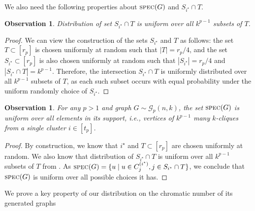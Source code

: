 \documentclass[11pt]{article}
\newtheorem{claim}[lemma]{Claim}
\newtheorem{observation}[lemma]{Observation}
\theoremstyle{definition}
\renewcommand{\geq}{\geqslant}
\newcommand{\card}[1]{\left\vert{#1}\right\vert}
\newcommand{\player}[1]{\ensuremath{\mathcal{P}_{#1}}}
\newcommand{\cG}{\ensuremath{\mathcal{G}}}
\newcommand{\cliqnum}[2]{\ensuremath{C^{(#1)}_{#2}}}
\newcommand{\spec}{\ensuremath{\textnormal{\textsc{spec}}}}
\newcommand{\istar}{\ensuremath{i^{\star}}}
\begin{document}
We also need the following properties about $\spec(G)$ and $S_{\istar} \cap T$. 
		\begin{observation}\label{obs:Sstar-T}
			Distribution of set $S_{\istar} \cap T$ is uniform over all $k^{p-1}$ subsets of $T$.
		\end{observation}
		\begin{proof}
			We can view the construction of the sets $S_{\istar}$ and $T$ as follows: the set $T\subset [r_p]$ is chosen uniformly at random such that $\card{T}=r_p/4$, and the set $S_{\istar}\subset [r_p]$ is also chosen uniformly at random such that $\card{S_{\istar}}=r_p/4$ and $\card{S_{\istar} \cap T } = k^{p-1}$.
			Therefore, the intersection $S_{\istar} \cap T$ is uniformly distributed over all $k^{p-1}$ subsets of $T$, as each such subset occurs with equal probability under the uniform randomly choice of $S_{\istar}$.
		\end{proof}
	
	\begin{observation}\label{obs:spec-uniform}
		For any $p > 1$ and graph $G \sim \cG_{p}(n,k)$, the set $\spec(G)$ is uniform over all elements in its support, i.e., vertices of $k^{p-1}$ many $k$-cliques from a single cluster $i \in [t_p]$.
	\end{observation}
	\begin{proof}
		By construction, we know that $\istar$ and $T\subset [r_p]$ are chosen uniformly at random. We also know that distribution of $S_{\istar} \cap T$ is uniform over all $k^{p-1}$ subsets of $T$ from . As $\spec(G)=\{u \mid u \in \cliqnum{\istar}{j}, j \in S_{\istar} \cap T\}$, we conclude that $\spec(G)$ is uniform over all possible choices it has.
	\end{proof}
	

%		
%	
	We prove a key property of our distribution on the chromatic number of its generated graphs
	
\end{document}
